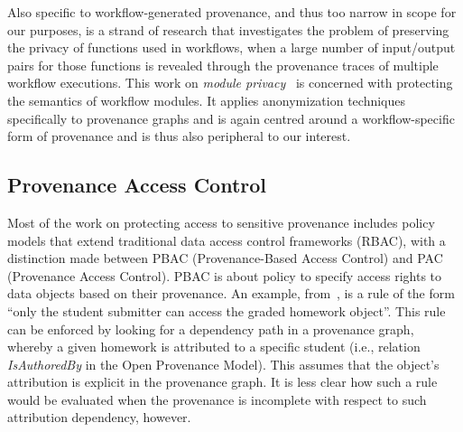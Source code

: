 Also specific to workflow-generated provenance, and thus too narrow in scope for our purposes, is a  strand of research that investigates the problem of preserving the privacy of functions used in workflows, when a large number of input/output pairs for those functions is revealed through the provenance traces of multiple workflow executions. This work on  \textit{module privacy}~\citep{Davidson:2011:PP:1938551.1938554,Davidson2010a,Davidson:2011:PVM:1989284.1989305} is concerned with protecting the semantics of workflow modules. 
It applies anonymization techniques specifically to provenance graphs and is again centred around a workflow-specific form of provenance and  is thus also peripheral to our interest.

%



\subsection{Provenance Access Control}

Most of the work on protecting access to sensitive provenance includes policy models that extend traditional data access control frameworks (RBAC), with a distinction made between PBAC (Provenance-Based Access Control) and PAC (Provenance Access Control).
%
PBAC is about policy to specify access rights to data objects based on their provenance.
%
An example, from~\citep{nguyen2012dependency}, is a rule of the form ``only the student submitter can access the graded homework object''. 
%
This rule can be enforced by looking for a dependency path in a provenance graph, whereby a given homework is attributed to a specific student (i.e., relation \textit{IsAuthoredBy} in the Open Provenance Model). This assumes that the object's attribution is explicit in the provenance graph. It is less clear how such a rule would be evaluated when the provenance is incomplete with respect to such attribution dependency, however.

